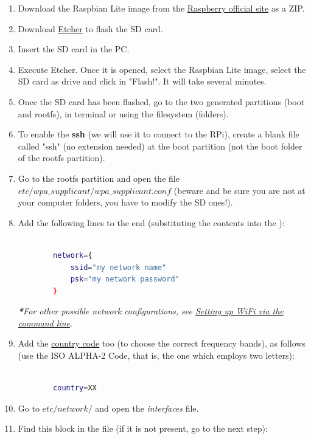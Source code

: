 \documentclass[12pt,a4paper,oneside]{article} %
\begin{document}
\begin{enumerate}
	\item Download the Raspbian Lite image from the \href{https://www.raspberrypi.org/downloads/raspbian/}{Raspberry official site} \citep{rasp-off} as a ZIP.
	\item Download \href{https://etcher.io/}{Etcher} \citep{etcher} to flash the SD card.
	\item Insert the SD card in the PC.
	\item Execute Etcher. Once it is opened, select the Raspbian Lite image, select the SD card as drive and click in "Flash!". It will take several minutes.
	\item Once the SD card has been flashed, go to the two generated partitions (boot and rootfs), in terminal or using the filesystem (folders).
	\item To enable the \textbf{ssh} (we will use it to connect to the RPi), create a blank file called "ssh" (no extension needed) at the boot partition (not the boot folder of the rootfs partition).
	\item Go to the rootfs partition and open the file $etc/wpa\_supplicant/wpa\_supplicant.conf$ (beware and be sure you are not at your computer folders, you have to modify the SD ones!).
	\item Add the following lines to the end (substituting the contents into the ):
	\begin{lstlisting}[language=sh,style=textstyle]
	
		network={
  			ssid="my network name"
  			psk="my network password"
		}
	\end{lstlisting}
	\emph{\textbf{*}For other possible network configurations, see \href{https://www.raspberrypi.org/documentation/configuration/wireless/wireless-cli.md}{Setting up WiFi via the command line}}.
	\linebreak\linebreak\linebreak
	\item Add the \href{http://www.nationsonline.org/oneworld/country_code_list.htm}{country code} too (to choose the correct frequency bands), as follows (use the ISO ALPHA-2 Code, that is, the one which employs two letters):
	\begin{lstlisting}[language=sh,style=textstyle]
	
		country=XX
	\end{lstlisting}
    \item Go to $etc/network/$ and open the \textit{interfaces} file.
    \item Find this block in the file (if it is not present, go to the next step):
    \begin{lstlisting}[language=sh,style=textstyle]
	

\end{lstlisting}
\end{enumerate}
\end{document}
